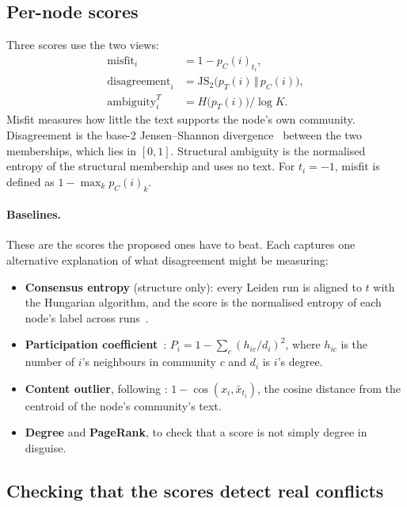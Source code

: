 \subsection{Per-node scores}
\label{sec:method-scores}
Three scores use the two views:
\begin{align}
  \text{misfit}_i &= 1 - p_C(i)_{t_i}, \\
  \text{disagreement}_i &= \mathrm{JS}_2\bigl(p_T(i)\,\Vert\,p_C(i)\bigr), \\
  \text{ambiguity}^T_i &= H\bigl(p_T(i)\bigr) / \log K.
\end{align}
Misfit measures how little the text supports the node's own community.
Disagreement is the base-2 Jensen--Shannon divergence~\citep{lin1991divergence}
between the two memberships, which lies in $[0,1]$. Structural ambiguity is the
normalised entropy of the structural membership and uses no text.
For $t_i=-1$, misfit is defined as $1-\max_k p_C(i)_k$.

\paragraph{Baselines.}
These are the scores the proposed ones have to beat. Each captures one alternative
explanation of what disagreement might be measuring:
\begin{itemize}
  \item \textbf{Consensus entropy} (structure only): every Leiden run is aligned to $t$
        with the Hungarian algorithm, and the score is the normalised entropy of each
        node's label across runs~\citep{riolo2020consistency}.
  \item \textbf{Participation coefficient}~\citep{guimera2005functional}:
        $P_i = 1-\sum_c (h_{ic}/d_i)^2$, where $h_{ic}$ is the number of $i$'s
        neighbours in community $c$ and $d_i$ is $i$'s degree.
  \item \textbf{Content outlier}, following \citet{gao2010outliers}:
        $1-\cos(x_i, \bar{x}_{t_i})$, the cosine distance from the centroid of the
        node's community's text.
  \item \textbf{Degree} and \textbf{PageRank}, to check that a score is not simply
        degree in disguise.
\end{itemize}

\subsection{Checking that the scores detect real conflicts}
\label{sec:method-detect}

